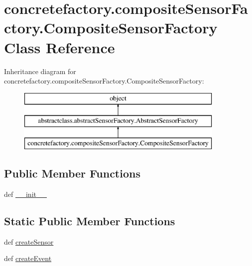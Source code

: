 \hypertarget{classconcretefactory_1_1compositeSensorFactory_1_1CompositeSensorFactory}{}\section{concretefactory.\+composite\+Sensor\+Factory.\+Composite\+Sensor\+Factory Class Reference}
\label{classconcretefactory_1_1compositeSensorFactory_1_1CompositeSensorFactory}
Inheritance diagram for concretefactory.\+composite\+Sensor\+Factory.\+Composite\+Sensor\+Factory\+:\begin{figure}[H]
\begin{center}
\leavevmode
\includegraphics[height=3.000000cm]{classconcretefactory_1_1compositeSensorFactory_1_1CompositeSensorFactory}
\end{center}
\end{figure}
\subsection*{Public Member Functions}
\begin{DoxyCompactItemize}
\item 
def \hyperlink{classconcretefactory_1_1compositeSensorFactory_1_1CompositeSensorFactory_ab3243f38d533e7a512b646fec5ef886a}{\+\_\+\+\_\+init\+\_\+\+\_\+}
\end{DoxyCompactItemize}
\subsection*{Static Public Member Functions}
\begin{DoxyCompactItemize}
\item 
def \hyperlink{classconcretefactory_1_1compositeSensorFactory_1_1CompositeSensorFactory_a2d3860525907a2f2d37c98163150ea03}{create\+Sensor}
\item 
def \hyperlink{classconcretefactory_1_1compositeSensorFactory_1_1CompositeSensorFactory_a7595788ac317e923ba510a444857c304}{create\+Event}
\end{DoxyCompactItemize}


